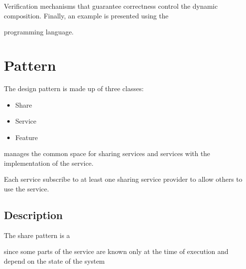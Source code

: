 \documentclass[a4paper,10pt,english,openany,oneside]{sphinxmanual}
\begin{document}
Verification mechanisms that guarantee correctness control the dynamic composition. Finally, an example is presented using the  %
\begin{footnote}[2]\sphinxAtStartFootnote
{}
%
\end{footnote}
programming language.


\chapter{Pattern}
\label{\detokenize{pattern:pattern}}\label{\detokenize{pattern::doc}}
The design pattern  is made up of three classes:
\begin{itemize}
\item {} 
Share

\item {} 
Service

\item {} 
Feature

\end{itemize}

 manages the common space for sharing services and services
with  the implementation of the service.

Each service  subscribe to at least one sharing service provider to allow others to use the
service.


\section{Description}
\label{\detokenize{pattern:description}}
\noindent{}

The share pattern is a  %
\begin{footnote}[1]\sphinxAtStartFootnote
{}
%
\end{footnote} since some parts
of the service are known only at the time of execution and depend on the state
of the system
\end{document}
